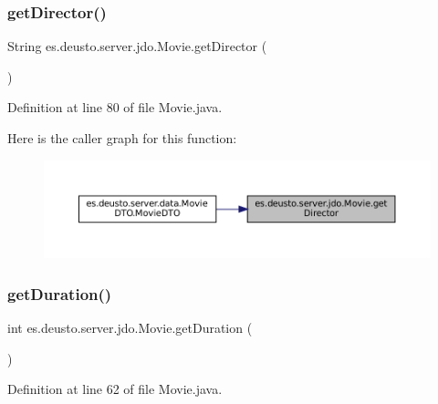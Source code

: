 \subsubsection{\texorpdfstring{getDirector()}{getDirector()}}
{\footnotesize\ttfamily String es.\+deusto.\+server.\+jdo.\+Movie.\+get\+Director (\begin{DoxyParamCaption}{ }\end{DoxyParamCaption})}



Definition at line 80 of file Movie.\+java.

Here is the caller graph for this function\+:
\nopagebreak
\begin{figure}[H]
\begin{center}
\leavevmode
\includegraphics[width=350pt]{classes_1_1deusto_1_1server_1_1jdo_1_1_movie_a4fae4f67472a1a789c1b926ce5417fe1_icgraph}
\end{center}
\end{figure}
\mbox{\label{classes_1_1deusto_1_1server_1_1jdo_1_1_movie_a3c056812ade3ddfa59723e5181c90206}} 
\subsubsection{\texorpdfstring{getDuration()}{getDuration()}}
{\footnotesize\ttfamily int es.\+deusto.\+server.\+jdo.\+Movie.\+get\+Duration (\begin{DoxyParamCaption}{ }\end{DoxyParamCaption})}



Definition at line 62 of file Movie.\+java.

